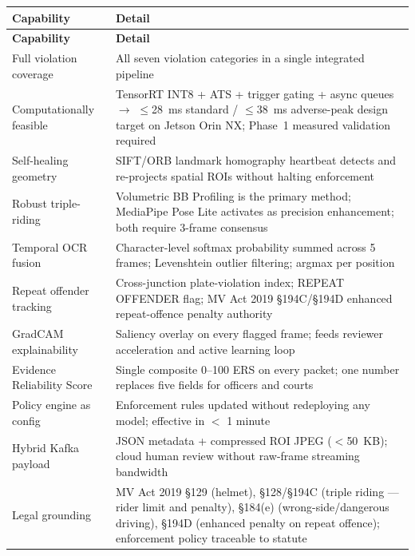 \documentclass[11pt,a4paper]{article}
\begin{document}
\begin{longtable}{L{4cm} L{11cm}}
    \toprule
    \color{white}\textbf{Capability} & \color{white}\textbf{Detail} \\
    \midrule
    \endfirsthead
    \toprule
    \color{white}\textbf{Capability} & \color{white}\textbf{Detail} \\
    \midrule
    \endhead
    \bottomrule
    \endfoot

    Full violation coverage & All seven violation categories in a single integrated pipeline \\
    Computationally feasible & TensorRT INT8 + ATS + trigger gating + async queues $\rightarrow$ $\leq$28~ms standard / $\leq$38~ms adverse-peak design target on Jetson Orin NX; Phase~1 measured validation required \\
    Self-healing geometry & SIFT/ORB landmark homography heartbeat detects and re-projects spatial ROIs without halting enforcement \\
    Robust triple-riding & Volumetric BB Profiling is the primary method; MediaPipe Pose Lite activates as precision enhancement; both require 3-frame consensus \\
    Temporal OCR fusion & Character-level softmax probability summed across 5 frames; Levenshtein outlier filtering; argmax per position \\
    Repeat offender tracking & Cross-junction plate-violation index; REPEAT OFFENDER flag; MV Act 2019 \S194C/\S194D enhanced repeat-offence penalty authority \\
    GradCAM explainability & Saliency overlay on every flagged frame; feeds reviewer acceleration and active learning loop \\
    Evidence Reliability Score & Single composite 0–100 ERS on every packet; one number replaces five fields for officers and courts \\
    Policy engine as config & Enforcement rules updated without redeploying any model; effective in $<$ 1 minute \\
    Hybrid Kafka payload & JSON metadata + compressed ROI JPEG ($<$50~KB); cloud human review without raw-frame streaming bandwidth \\
    Legal grounding & MV Act 2019 \S129 (helmet), \S128/\S194C (triple riding — rider limit and penalty), \S184(e) (wrong-side/dangerous driving), \S194D (enhanced penalty on repeat offence); enforcement policy traceable to statute \\
\end{longtable}
\end{document}
